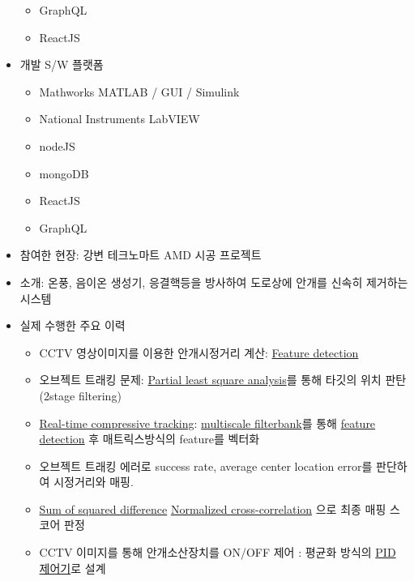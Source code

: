\documentclass[10pt,a4paper,ragged2e]{altacv}
\begin{document}
\begin{fullwidth}
\begin{itemize}
\begin{itemize}
    \item GraphQL
    \item ReactJS
   \end{itemize}
\item 개발 S/W 플랫폼
  \begin{itemize}
    \item Mathworks MATLAB / GUI / Simulink
    \item National Instruments LabVIEW
    \item nodeJS
    \item mongoDB
    \item ReactJS
    \item GraphQL
  \end{itemize}
\item 참여한 현장: 강변 테크노마트 AMD 시공 프로젝트
\end{itemize}

\divider


\begin{itemize}
\item 소개: 온풍, 음이온 생성기, 응결핵등을 방사하여 도로상에 안개를 신속히 제거하는 시스템
\item 실제 수행한 주요 이력
  \begin{itemize}
    \item CCTV 영상이미지를 이용한 안개시정거리 계산: \href{https://en.wikipedia.org/wiki/Feature_detection_(computer_vision)}{Feature detection}
    \item 오브젝트 트래킹 문제: \href{https://en.wikipedia.org/wiki/Partial_least_squares_regression}{Partial least square analysis}를 통해 타깃의 위치 판탄 (2stage filtering)
    \item \href{http://www4.comp.polyu.edu.hk/~cslzhang/CT/CT.htm}{Real-time compressive tracking}: \href{https://en.wikipedia.org/wiki/Filter_bank}{multiscale filterbank}를 통해 \href{https://en.wikipedia.org/wiki/Feature_detection_(computer_vision)}{feature detection} 후 매트릭스방식의 feature를 벡터화
    \item 오브젝트 트래킹 에러로 success rate, average center location error를 판단하여 시정거리와 매핑.
    \item \href{https://siddhantahuja.wordpress.com/tag/sum-of-squared-differences/}{Sum of squared difference} \/ \href{https://en.wikipedia.org/wiki/Cross-correlation\#Normalized_cross-correlation}{Normalized cross-correlation} 으로 최종 매핑 스코어 판정
    \item CCTV 이미지를 통해 안개소산장치를 ON/OFF 제어 : 평균화 방식의 \href{https://en.wikipedia.org/wiki/PID_controller}{PID 제어기}로 설계
  \end{itemize}
\end{itemize}


\end{fullwidth}
\end{document}
